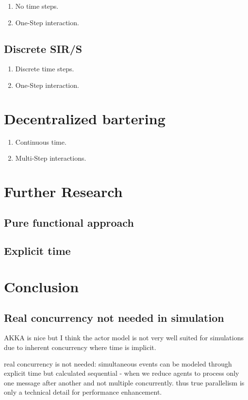 \begin{enumerate}
\item No time steps.
\item One-Step interaction.
\end{enumerate}

\subsection{Discrete SIR/S}
\begin{enumerate}
\item Discrete time steps.
\item One-Step interaction.
\end{enumerate}

\section{Decentralized bartering}

\begin{enumerate}
\item Continuous time.
\item Multi-Step interactions.
\end{enumerate}

\section{Further Research}
\subsection{Pure functional approach}
\subsection{Explicit time}

\section{Conclusion}
\subsection{Real concurrency not needed in simulation}
AKKA is nice but I think the actor model is not very well suited for simulations  due to inherent concurrency where time is implicit. 

real concurrency is not needed: simultaneous events can be modeled through explicit time but calculated sequential - when we reduce agents to process only one message after another and not multiple concurrently. thus true parallelism is only a technical detail for performance enhancement.
